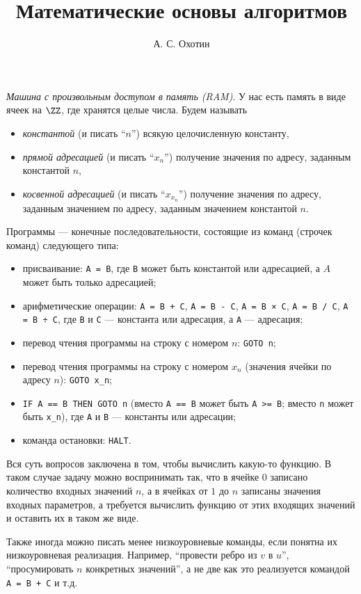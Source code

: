 \documentclass[12pt,a4paper]{article}
\title{Математические основы алгоритмов}
\author{А. С. Охотин}
\date{}
\begin{document}
    \maketitle

    \begin{definition}
        \emph{Машина с произвольным доступом в память (RAM)}. У нас есть память в виде ячеек на $\ZZ$, где хранятся целые числа. Будем называть
        \begin{itemize}
            \item \emph{константой} (и писать ``$n$'') всякую целочисленную константу,
            \item \emph{прямой адресацией} (и писать ``$x_n$'') получение значения по адресу, заданным константой $n$,
            \item \emph{косвенной адресацией} (и писать ``$x_{x_n}$'') получение значения по адресу, заданным значением по адресу, заданным значением константой $n$.
        \end{itemize}
        Программы --- конечные последовательности, состоящие из команд (строчек команд) следующего типа:
        \begin{itemize}
            \item присваивание: \verb|A = B|, где \verb|B| может быть константой или адресацией, а $A$ может быть только адресацией;
            \item арифметические операции: \verb|A = B + C|, \verb|A = B - C|, \verb|A = B × C|, \verb|A = B / C|, \verb|A = B ÷ C|, где \verb|B| и \verb|C| --- константа или адресация, а \verb|A| --- адресация;
            \item перевод чтения программы на строку с номером $n$: \verb|GOTO n|;
            \item перевод чтения программы на строку с номером $x_n$ (значения ячейки по адресу $n$): \verb|GOTO x_n|;
            \item \verb|IF A == B THEN GOTO n| (вместо \verb|A == B| может быть \verb|A >= B|; вместо \verb|n| может быть \verb|x_n|), где \verb|A| и \verb|B| --- константы или адресации;
            \item команда остановки: \verb|HALT|.
        \end{itemize}
    \end{definition}

    \begin{remark*}
        Вся суть вопросов заключена в том, чтобы вычислить какую-то функцию. В таком случае задачу можно воспринимать так, что в ячейке $0$ записано количество входных значений $n$, а в ячейках от $1$ до $n$ записаны значения входных параметров, а требуется вычислить функцию от этих входящих значений и оставить их в таком же виде.

        Также иногда можно писать менее низкоуровневые команды, если понятна их низкоуровневая реализация. Например, ``провести ребро из $v$ в $u$'', ``просумировать $n$ конкретных значений'', а не две как это реализуется командой \verb|A = B + C| и т.д.
    \end{remark*}
\end{document}
